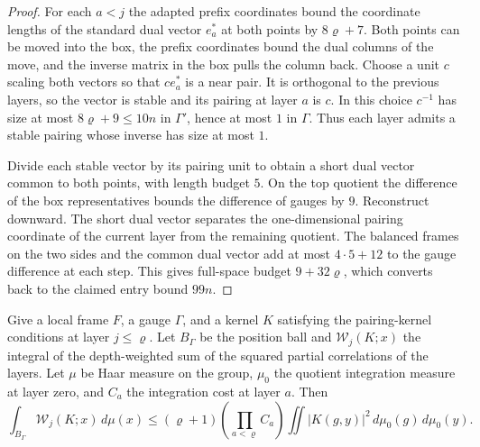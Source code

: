 \begin{proof}
For each $a<j$ the adapted prefix coordinates bound the coordinate lengths of the standard dual vector $e_a^\ast$ at both points by $8\varrho+7$. Both points can be moved into the box, the prefix coordinates bound the dual columns of the move, and the inverse matrix in the box pulls the column back. Choose a unit $c$ scaling both vectors so that $c e_a^\ast$ is a near pair. It is orthogonal to the previous layers, so the vector is stable and its pairing at layer $a$ is $c$. In this choice $c^{-1}$ has size at most $8\varrho+9\le10n$ in $\Gamma'$, hence at most $1$ in $\Gamma$. Thus each layer admits a stable pairing whose inverse has size at most $1$.

Divide each stable vector by its pairing unit to obtain a short dual vector common to both points, with length budget $5$. On the top quotient the difference of the box representatives bounds the difference of gauges by $9$. Reconstruct downward. The short dual vector separates the one-dimensional pairing coordinate of the current layer from the remaining quotient. The balanced frames on the two sides and the common dual vector add at most $4\cdot5+12$ to the gauge difference at each step. This gives full-space budget $9+32\varrho$, which converts back to the claimed entry bound $99n$.
\end{proof}

\begin{lemma}
\label{lem:b-one-frame-weighted-integral}
\emitthmsource
Give a local frame $F$, a gauge $\Gamma$, and a kernel $K$ satisfying the pairing-kernel conditions at layer $j\le\varrho$.
Let $B_\Gamma$ be the position ball and $\mathcal W_j(K;x)$ the integral of the depth-weighted sum of the squared partial correlations of the layers.
Let $\mu$ be Haar measure on the group, $\mu_0$ the quotient integration measure at layer zero, and $C_a$ the integration cost at layer $a$. Then
\[
 \int_{B_\Gamma}\mathcal W_j(K;x)\,d\mu(x)
 \le (\varrho+1)\left(\prod_{a<\varrho}C_a\right)
      \iint |K(g,y)|^2\,d\mu_0(g)\,d\mu_0(y).
\]
\end{lemma}

